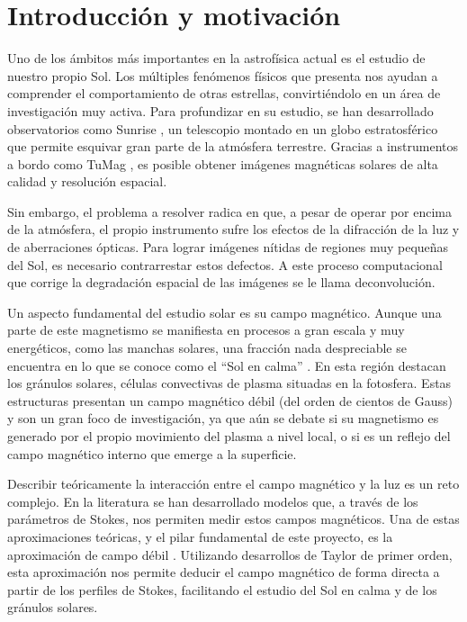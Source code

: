 
\section{Introducción y motivación}
Uno de los ámbitos más importantes en la astrofísica actual es el estudio de nuestro propio Sol. Los múltiples fenómenos físicos que presenta nos ayudan a comprender el comportamiento de otras estrellas, convirtiéndolo en un área de investigación muy activa. Para profundizar en su estudio, se han desarrollado observatorios como Sunrise \cite{Barthol2011}, un telescopio montado en un globo estratosférico que permite esquivar gran parte de la atmósfera terrestre. Gracias a instrumentos a bordo como TuMag \cite{SUNRISETuMagTUMAGData}, es posible obtener imágenes magnéticas solares de alta calidad y resolución espacial.

Sin embargo, el problema a resolver radica en que, a pesar de operar por encima de la atmósfera, el propio instrumento sufre los efectos de la difracción de la luz y de aberraciones ópticas. Para lograr imágenes nítidas de regiones muy pequeñas del Sol, es necesario contrarrestar estos defectos. A este proceso computacional que corrige la degradación espacial de las imágenes se le llama deconvolución.

Un aspecto fundamental del estudio solar es su campo magnético. Aunque una parte de este magnetismo se manifiesta en procesos a gran escala y muy energéticos, como las manchas solares, una fracción nada despreciable se encuentra en lo que se conoce como el ``Sol en calma'' \cite{BellotRubio2019}. En esta región destacan los gránulos solares, células convectivas de plasma situadas en la fotosfera. Estas estructuras presentan un campo magnético débil (del orden de cientos de Gauss) y son un gran foco de investigación, ya que aún se debate si su magnetismo es generado por el propio movimiento del plasma a nivel local, o si es un reflejo del campo magnético interno que emerge a la superficie.

Describir teóricamente la interacción entre el campo magnético y la luz es un reto complejo. En la literatura se han desarrollado modelos que, a través de los parámetros de Stokes, nos permiten medir estos campos magnéticos. Una de estas aproximaciones teóricas, y el pilar fundamental de este proyecto, es la aproximación de campo débil \cite{cteGeff}. Utilizando desarrollos de Taylor de primer orden, esta aproximación nos permite deducir el campo magnético de forma directa a partir de los perfiles de Stokes, facilitando el estudio del Sol en calma y de los gránulos solares.

